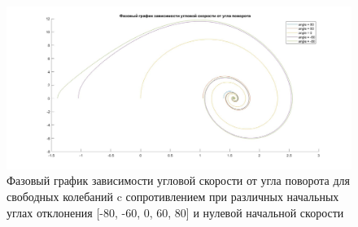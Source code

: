 \documentclass{article}
\begin{document}
	\begin{figure}[H]
		\centering
		\includegraphics[width=1.2\linewidth]{phase2}
		\caption{Фазовый график зависимости угловой скорости от угла поворота для свободных колебаний c сопротивлением при различных начальных углах отклонения [-80, -60, 0, 60, 80] и нулевой начальной скорости}
		\label{fig:phase2}
	\end{figure}
\end{document}
